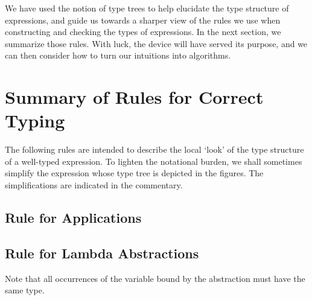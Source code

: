 We have used the notion of type trees to help elucidate the type structure of
expressions, and guide us towards a sharper view of the rules we use when
constructing and checking the types of expressions. In the next section, we
summarize those rules. With luck, the device will have served its purpose, and
we can then consider how to turn our intuitions into algorithms.

\section{Summary of Rules for Correct Typing}

The following rules are intended to describe the local `look' of the type
structure of a well-typed expression. To lighten the notational burden, we
shall sometimes simplify the expression whose type tree is depicted in the
figures. The simplifications are indicated in the commentary.

\subsection{Rule for Applications}


\subsection{Rule for Lambda Abstractions}

\noindent
Note that all occurrences of the variable  bound by the abstraction must have
the same type.
